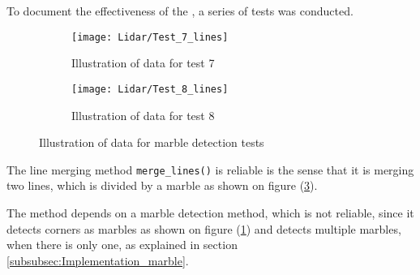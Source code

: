 \documentclass[../Head/Main.tex]{subfiles}
\begin{document}
To document the effectiveness of the , a series of tests was conducted.
\begin{figure}[H]
  \begin{subfigure}[b]{0.5\textwidth}
  	\centering
    \texttt{[image: Lidar/Test\_7\_lines]}
    \caption{Illustration of data for test 7}
    \label{fig:LineTest7}
  \end{subfigure}
  \hfill
  \begin{subfigure}[b]{0.5\textwidth}
  	\centering
    \texttt{[image: Lidar/Test\_8\_lines]}
    \caption{Illustration of data for test 8}
    \label{fig:LineTest8}
  \end{subfigure}
  \caption{Illustration of data for marble detection tests}
\end{figure}
The line merging method \texttt{merge\_lines()} is reliable is the sense that it is merging two lines, which is divided by a marble as shown on figure (\ref{fig:LineTest8}). \par
The method depends on a marble detection method, which is not reliable, since it detects corners as marbles as shown on figure (\ref{fig:LineTest7}) and detects multiple marbles, when there is only one, as explained in section \ref{subsubsec:Implementation_marble}.
\end{document}
